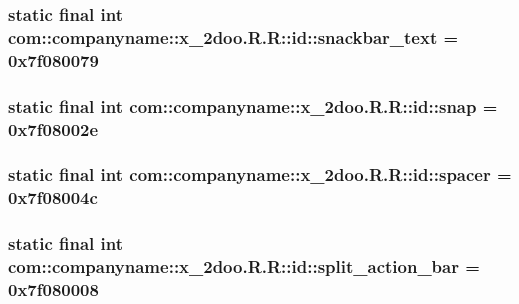 \hypertarget{classcom_1_1companyname_1_1x__2doo_1_1_r_1_1id_679be03ad68270426a0d0b2fb5b3d13e}{
\subsubsection[{snackbar\_\-text}]{\setlength{\rightskip}{0pt plus 5cm}static final int com::companyname::x\_\-2doo.R.R::id::snackbar\_\-text = 0x7f080079}}
\label{classcom_1_1companyname_1_1x__2doo_1_1_r_1_1id_679be03ad68270426a0d0b2fb5b3d13e}


\hypertarget{classcom_1_1companyname_1_1x__2doo_1_1_r_1_1id_0ea54204ac6ce1388fe69d7feecb779e}{
\subsubsection[{snap}]{\setlength{\rightskip}{0pt plus 5cm}static final int com::companyname::x\_\-2doo.R.R::id::snap = 0x7f08002e}}
\label{classcom_1_1companyname_1_1x__2doo_1_1_r_1_1id_0ea54204ac6ce1388fe69d7feecb779e}


\hypertarget{classcom_1_1companyname_1_1x__2doo_1_1_r_1_1id_01fcaa991ccbc6b0dc37f22e1348e6e8}{
\subsubsection[{spacer}]{\setlength{\rightskip}{0pt plus 5cm}static final int com::companyname::x\_\-2doo.R.R::id::spacer = 0x7f08004c}}
\label{classcom_1_1companyname_1_1x__2doo_1_1_r_1_1id_01fcaa991ccbc6b0dc37f22e1348e6e8}


\hypertarget{classcom_1_1companyname_1_1x__2doo_1_1_r_1_1id_0645e3d377a90f9946b04d55a34330f8}{
\subsubsection[{split\_\-action\_\-bar}]{\setlength{\rightskip}{0pt plus 5cm}static final int com::companyname::x\_\-2doo.R.R::id::split\_\-action\_\-bar = 0x7f080008}}
\label{classcom_1_1companyname_1_1x__2doo_1_1_r_1_1id_0645e3d377a90f9946b04d55a34330f8}


